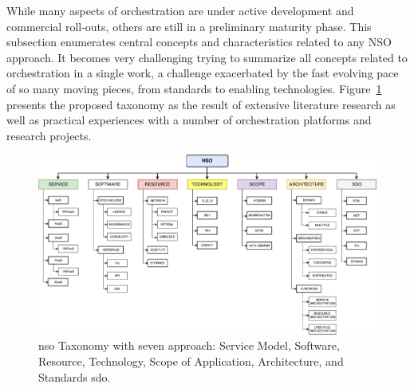 While many aspects of orchestration are under active development and commercial roll-outs, others are still in a preliminary maturity phase. This subsection enumerates  central concepts and characteristics related to any NSO approach. It becomes very challenging trying to summarize  all concepts related to orchestration in a single work, a challenge exacerbated by  the fast evolving pace of so many moving pieces, from standards to enabling technologies. Figure~\ref{tax} presents the proposed taxonomy as the result of extensive literature research as well as practical  experiences with a number of orchestration platforms and research projects.   

\begin{figure}[thpb]
  \centering
  \includegraphics[scale=.37]{Figures/03_NSO/taxonomy}
    \caption{\gls{nso} Taxonomy with seven approach: Service Model, Software, Resource, Technology, Scope of Application, Architecture, and Standards \acrfull{sdo}.}
    \label{tax}
\end{figure}

